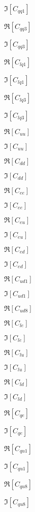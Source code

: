 \documentclass{article}
\begin{document}
$ \Im \left[ C_{qq1} \right]$
\pagebreak

$ \Re \left[ C_{qq3} \right]$
\pagebreak

$ \Im \left[ C_{qq3} \right]$
\pagebreak

$ \Re \left[ C_{lq1} \right]$
\pagebreak

$ \Im \left[ C_{lq1} \right]$
\pagebreak

$ \Re \left[ C_{lq3} \right]$
\pagebreak

$ \Im \left[ C_{lq3} \right]$
\pagebreak

$ \Re \left[ C_{uu} \right]$
\pagebreak

$ \Im \left[ C_{uu} \right]$
\pagebreak

$ \Re \left[ C_{dd} \right]$
\pagebreak

$ \Im \left[ C_{dd} \right]$
\pagebreak

$ \Re \left[ C_{ee} \right]$
\pagebreak

$ \Im \left[ C_{ee} \right]$
\pagebreak

$ \Re \left[ C_{eu} \right]$
\pagebreak

$ \Im \left[ C_{eu} \right]$
\pagebreak

$ \Re \left[ C_{ed} \right]$
\pagebreak

$ \Im \left[ C_{ed} \right]$
\pagebreak

$ \Re \left[ C_{ud1} \right]$
\pagebreak

$ \Im \left[ C_{ud1} \right]$
\pagebreak

$ \Re \left[ C_{ud8} \right]$
\pagebreak

$ \Re \left[ C_{le} \right]$
\pagebreak

$ \Im \left[ C_{le} \right]$
\pagebreak

$ \Re \left[ C_{lu} \right]$
\pagebreak

$ \Im \left[ C_{lu} \right]$
\pagebreak

$ \Re \left[ C_{ld} \right]$
\pagebreak

$ \Im \left[ C_{ld} \right]$
\pagebreak

$ \Re \left[ C_{qe} \right]$
\pagebreak

$ \Im \left[ C_{qe} \right]$
\pagebreak

$ \Re \left[ C_{qu1} \right]$
\pagebreak

$ \Im \left[ C_{qu1} \right]$
\pagebreak

$ \Re \left[ C_{qu8} \right]$
\pagebreak

$ \Im \left[ C_{qu8} \right]$
\pagebreak
\end{document}
